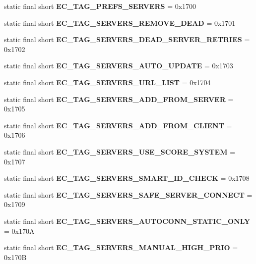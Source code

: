 \begin{DoxyCompactItemize}
\item 
static final short {\bfseries EC\_\-TAG\_\-PREFS\_\-SERVERS} = 0x1700\label{interfaceECCodes_a3e1f899f3fa8d01ee53d5cd4eeb141f9}

\item 
static final short {\bfseries EC\_\-TAG\_\-SERVERS\_\-REMOVE\_\-DEAD} = 0x1701\label{interfaceECCodes_a446b684230fb1e817e958e1ea25d6b35}

\item 
static final short {\bfseries EC\_\-TAG\_\-SERVERS\_\-DEAD\_\-SERVER\_\-RETRIES} = 0x1702\label{interfaceECCodes_ae78db3fbf2b27e156f2bc010500b5436}

\item 
static final short {\bfseries EC\_\-TAG\_\-SERVERS\_\-AUTO\_\-UPDATE} = 0x1703\label{interfaceECCodes_aa34106977b3fb2ad30b3e715fc2b1a13}

\item 
static final short {\bfseries EC\_\-TAG\_\-SERVERS\_\-URL\_\-LIST} = 0x1704\label{interfaceECCodes_a06c35a4d812e5a92712ca7470ec97d73}

\item 
static final short {\bfseries EC\_\-TAG\_\-SERVERS\_\-ADD\_\-FROM\_\-SERVER} = 0x1705\label{interfaceECCodes_a980f0168beab07a17e5aa19431732987}

\item 
static final short {\bfseries EC\_\-TAG\_\-SERVERS\_\-ADD\_\-FROM\_\-CLIENT} = 0x1706\label{interfaceECCodes_a0c4d617929062440dd350556adfaec1a}

\item 
static final short {\bfseries EC\_\-TAG\_\-SERVERS\_\-USE\_\-SCORE\_\-SYSTEM} = 0x1707\label{interfaceECCodes_a5e236196e81d70f6ce7c6f0e2f00a02d}

\item 
static final short {\bfseries EC\_\-TAG\_\-SERVERS\_\-SMART\_\-ID\_\-CHECK} = 0x1708\label{interfaceECCodes_a986af699f4d01bc4127a1271c75cb4ad}

\item 
static final short {\bfseries EC\_\-TAG\_\-SERVERS\_\-SAFE\_\-SERVER\_\-CONNECT} = 0x1709\label{interfaceECCodes_a40172ffb7aca909926d2a84a21b17f17}

\item 
static final short {\bfseries EC\_\-TAG\_\-SERVERS\_\-AUTOCONN\_\-STATIC\_\-ONLY} = 0x170A\label{interfaceECCodes_a8335c3bb0ffc73231a04541f996588f3}

\item 
static final short {\bfseries EC\_\-TAG\_\-SERVERS\_\-MANUAL\_\-HIGH\_\-PRIO} = 0x170B\label{interfaceECCodes_a4d601a310195e49d191f9054a5b5d90e}


\end{DoxyCompactItemize}
